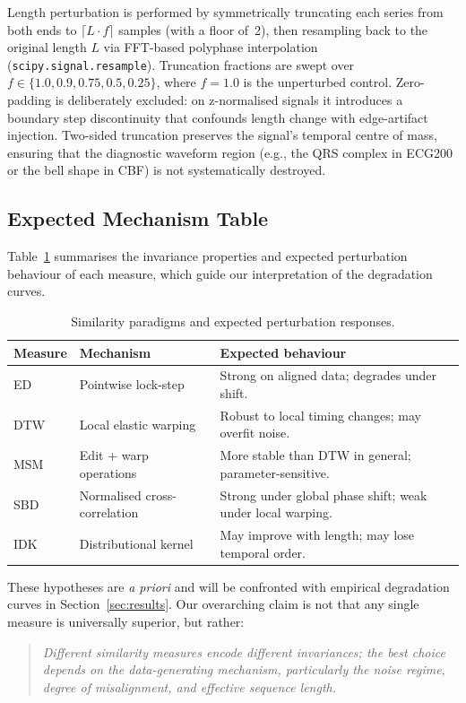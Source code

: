 Length perturbation is performed by symmetrically truncating each series from both ends to $\lceil L \cdot f \rceil$ samples (with a floor of~2), then resampling back to the original length $L$ via FFT-based polyphase interpolation (\texttt{scipy.signal.resample}).
Truncation fractions are swept over $f \in \{1.0, 0.9, 0.75, 0.5, 0.25\}$, where $f=1.0$ is the unperturbed control.
Zero-padding is deliberately excluded: on z-normalised signals it introduces a boundary step discontinuity that confounds length change with edge-artifact injection.
Two-sided truncation preserves the signal's temporal centre of mass, ensuring that the diagnostic waveform region (e.g., the QRS complex in ECG200 or the bell shape in CBF) is not systematically destroyed.

\subsection{Expected Mechanism Table}\label{sec:method-mechanisms}

Table~\ref{tab:mechanisms} summarises the invariance properties and expected perturbation behaviour of each measure, which guide our interpretation of the degradation curves.

\begin{table}[htbp]
\centering
\caption{Similarity paradigms and expected perturbation responses.}\label{tab:mechanisms}
\small
\begin{tabular}{lll}
\toprule
Measure & Mechanism & Expected behaviour \\
\midrule
ED  & Pointwise lock-step & Strong on aligned data; degrades under shift. \\
DTW & Local elastic warping & Robust to local timing changes; may overfit noise. \\
MSM & Edit + warp operations & More stable than DTW in general; parameter-sensitive. \\
SBD & Normalised cross-correlation & Strong under global phase shift; weak under local warping. \\
IDK & Distributional kernel & May improve with length; may lose temporal order. \\
\bottomrule
\end{tabular}
\end{table}

These hypotheses are \emph{a priori} and will be confronted with empirical degradation curves in Section~\ref{sec:results}.
Our overarching claim is not that any single measure is universally superior, but rather:
\begin{quote}
\emph{Different similarity measures encode different invariances; the best choice depends on the data-generating mechanism, particularly the noise regime, degree of misalignment, and effective sequence length.}
\end{quote}

